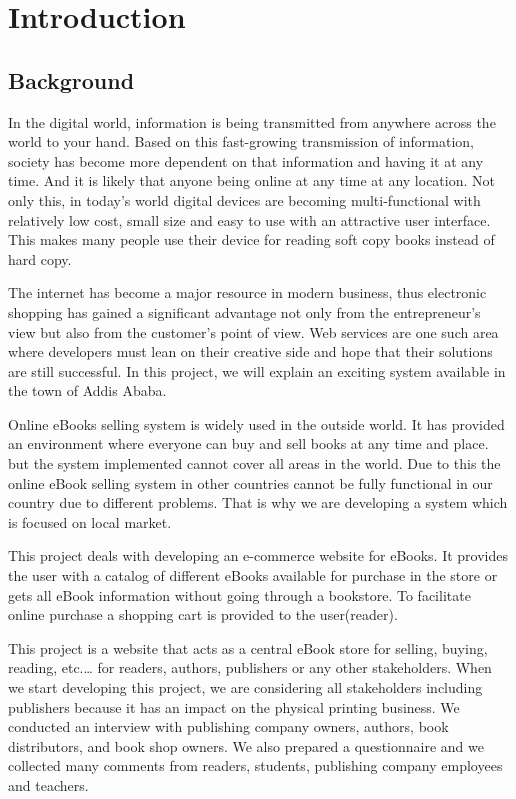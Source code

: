 \chapter{Introduction}
\section{Background}

In the digital world, information is being transmitted from anywhere across the world to your hand. Based on this fast-growing transmission of information, society has become more dependent on that information and having it at any time. And it is likely that anyone being online at any time at any location. Not only this, in today’s world digital devices are becoming multi-functional with relatively low cost, small size and easy to use with an attractive user interface. This makes many people use their device for reading soft copy books instead of hard copy.
	
The internet has become a major resource in modern business, thus electronic shopping has gained a significant advantage not only from the entrepreneur’s view but also from the customer’s point of view. Web services are one such area where developers must lean on their creative side and hope that their solutions are still successful. In this project, we will explain an exciting system available in the town of Addis Ababa.


Online eBooks selling system is widely used in the outside world. It has provided an environment where everyone can buy and sell books at any time and place. but the system implemented cannot cover all areas in the world. Due to this the online eBook selling system in other countries cannot be fully functional in our country due to different problems. That is why we are developing a system which is focused on local market.

This project deals with developing an e-commerce website for eBooks. It provides the user with a catalog of different eBooks available for purchase in the store or gets all eBook information without going through a bookstore. To facilitate online purchase a shopping cart is provided to the user(reader).

This project is a website that acts as a central eBook store for selling, buying, reading, etc.… for readers, authors, publishers or any other stakeholders. When we start developing this project, we are considering all stakeholders including publishers because it has an impact on the physical printing business.  We conducted an interview with publishing company owners, authors, book distributors, and book shop owners. We also prepared a questionnaire and we collected many comments from readers, students, publishing company employees and teachers.

